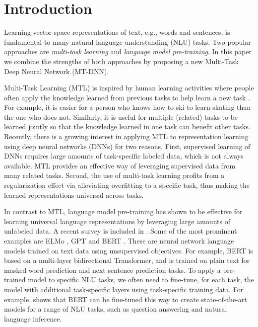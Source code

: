 \section{Introduction}
\label{sec:introduction}

Learning vector-space representations of text, e.g., words and sentences, is fundamental to many natural language understanding (NLU) tasks. Two popular approaches are \emph{multi-task learning} and \emph{language model pre-training}. In this paper we combine the strengths of both approaches by proposing a new Multi-Task Deep Neural Network (MT-DNN).

Multi-Task Learning (MTL) is inspired by human learning activities where people often apply the knowledge learned from previous tasks to help learn a new task \citep{caruana1997multitask,zhang2017survey}. For example, it is easier for a person who knows how to ski to learn skating than the one who does not. Similarly, it is useful for multiple (related) tasks to be learned jointly so that the knowledge learned in one task can benefit other tasks.  
Recently, there is a growing interest in applying MTL to representation learning using deep neural networks (DNNs) \citep{collobert2011natural,liu2015mtl,luong2015multi,mt-mrc2018,guo2018soft, ruder122019latent} for two reasons. 
First, supervised learning of DNNs requires large amounts of task-specific labeled data, which is not always available. MTL provides an effective way of leveraging supervised data from many related tasks. 
Second, the use of multi-task learning profits from a regularization effect via alleviating overfitting to a specific task, thus making the learned representations universal across tasks. 

In contrast to MTL, language model pre-training has shown to be effective for learning universal language representations by leveraging large amounts of unlabeled data. A recent survey is included in \citet{gao2018neural}. Some of the most prominent examples are ELMo \citep{elmo2018}, GPT \citep{gpt2018} and BERT \citep{bert2018}. These are neural network language models trained on text data using unsupervised objectives. 
For example, BERT is based on a multi-layer bidirectional Transformer, and is trained on plain text for masked word prediction and next sentence prediction tasks. 
To apply a pre-trained model to specific NLU tasks, we often need to fine-tune, for each task, the model with additional task-specific layers using task-specific training data. 
For example, \citet{bert2018} shows that BERT can be fine-tuned this way to create state-of-the-art models for a range of NLU tasks, such as question answering and natural language inference.

